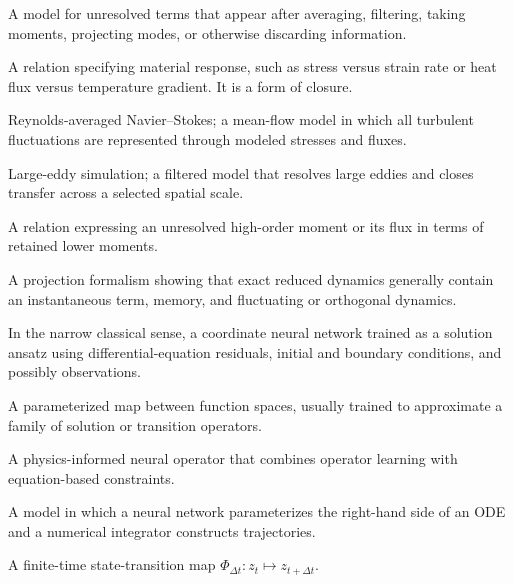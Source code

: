 \documentclass[11pt]{article}
\begin{document}
\begin{description}[style=nextline,leftmargin=1.5em,labelsep=0.5em]
\item[Closure]
A model for unresolved terms that appear after averaging, filtering, taking moments, projecting modes, or otherwise discarding information.

\item[Constitutive relation]
A relation specifying material response, such as stress versus strain rate or heat flux versus temperature gradient. It is a form of closure.

\item[RANS]
Reynolds-averaged Navier--Stokes; a mean-flow model in which all turbulent fluctuations are represented through modeled stresses and fluxes.

\item[LES]
Large-eddy simulation; a filtered model that resolves large eddies and closes transfer across a selected spatial scale.

\item[Moment closure]
A relation expressing an unresolved high-order moment or its flux in terms of retained lower moments.

\item[Mori--Zwanzig reduction]
A projection formalism showing that exact reduced dynamics generally contain an instantaneous term, memory, and fluctuating or orthogonal dynamics.

\item[PINN]
In the narrow classical sense, a coordinate neural network trained as a solution ansatz using differential-equation residuals, initial and boundary conditions, and possibly observations.

\item[Neural operator]
A parameterized map between function spaces, usually trained to approximate a family of solution or transition operators.

\item[PINO]
A physics-informed neural operator that combines operator learning with equation-based constraints.

\item[Neural ODE]
A model in which a neural network parameterizes the right-hand side of an ODE and a numerical integrator constructs trajectories.

\item[Flow map]
A finite-time state-transition map \(\Phi_{\Delta t}:z_t\mapsto z_{t+\Delta t}\).


\end{description}
\end{document}
